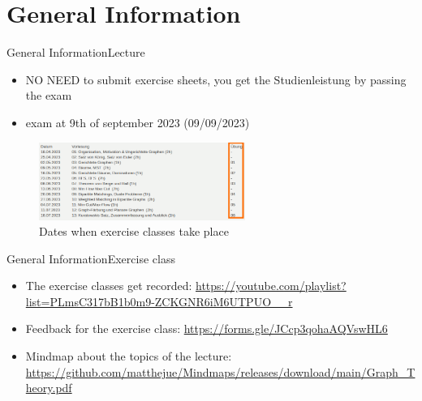 
\section{General Information}

\begin{frame}{General Information}{Lecture}
  \begin{itemize}
    \item {\large \uppercase{\alert{no need}}} to submit exercise sheets, you get the \alert{Studienleistung} by \alert{passing the exam}
    \item \alert{exam} at 9th of september 2023 (09/09/2023)
  \end{itemize}
  \begin{figure}
    \includegraphics[width=0.6\textwidth]{./figures/dates.png}
    \caption{Dates when exercise classes take place}
  \end{figure}
\end{frame}

\begin{frame}{General Information}{Exercise class}
  \begin{itemize}
    \item The exercise classes get \alert{recorded}: \url{https://youtube.com/playlist?list=PLmsC317bB1b0m9-ZCKGNR6iM6UTPUO__r}
    \item \alert{Feedback} for the exercise class: \url{https://forms.gle/JCcp3qohaAQVswHL6}
    \item \alert{Mindmap} about the topics of the lecture: \url{https://github.com/matthejue/Mindmaps/releases/download/main/Graph_Theory.pdf}
  \end{itemize}
\end{frame}
